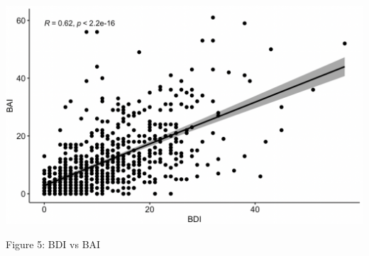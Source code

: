 \documentclass{article}
\begin{document}
\bigskip
\bigskip
\bigskip
\bigskip
\bigskip

{\centering \includegraphics[scale=0.6]{BDIBAIcorr.png} \par}

{\centering Figure 5: BDI vs BAI \par}

\vspace*{\fill}
\end{document}
